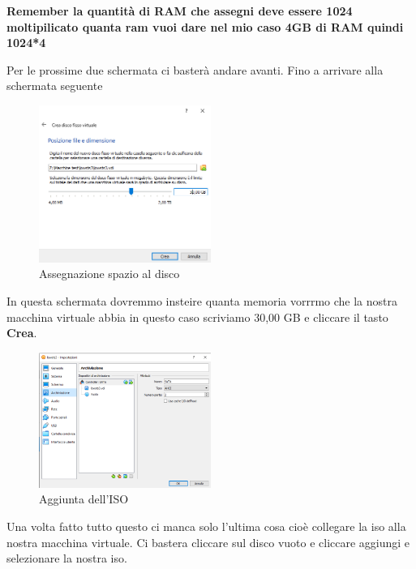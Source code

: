 \documentclass[../main.tex]{subfiles}
\begin{document}
\textbf{Remember la quantità di RAM che assegni deve essere 1024 moltipilicato quanta ram vuoi dare nel mio caso 4GB di RAM quindi 1024*4}

Per le prossime due schermata ci basterà andare avanti. Fino a arrivare alla schermata seguente

\begin{figure}[h]
    \centering
    \includegraphics[width=0.5\textwidth]{Images/set-up5.PNG}
    \caption{Assegnazione spazio al disco}
\end{figure}


In questa schermata dovremmo insteire quanta memoria vorrrmo che la nostra macchina virtuale abbia in questo caso scriviamo 30,00 GB e cliccare il tasto \textbf{Crea}.


\begin{figure}[h]
    \centering
    \includegraphics[width=0.5\textwidth]{Images/set-up6.PNG}
    \caption{Aggiunta dell'ISO}
\end{figure}
\pagebreak{}
\thispagestyle{header-pages}

Una volta fatto tutto questo ci manca solo l'ultima cosa cioè collegare la iso alla nostra macchina virtuale. Ci bastera cliccare sul disco vuoto e cliccare aggiungi e selezionare la nostra iso.
\end{document}
